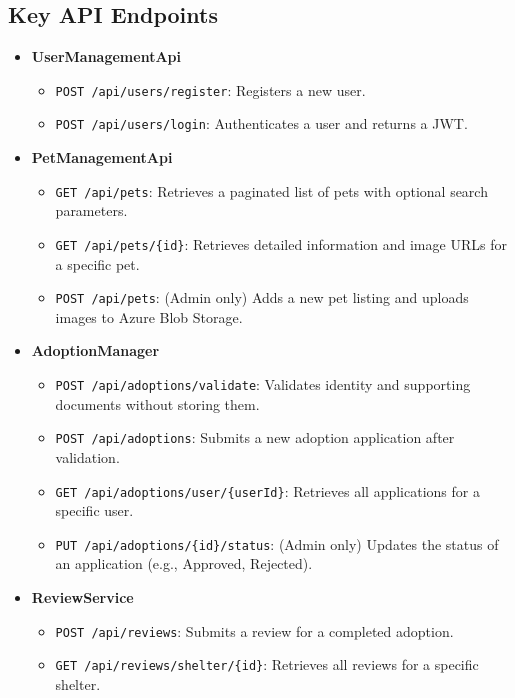 \subsection*{Key API Endpoints}
\begin{itemize}
    \item \textbf{UserManagementApi}
    \begin{itemize}
        \item \texttt{POST /api/users/register}: Registers a new user.
        \item \texttt{POST /api/users/login}: Authenticates a user and returns a JWT.
    \end{itemize}
    
    \item \textbf{PetManagementApi}
    \begin{itemize}
        \item \texttt{GET /api/pets}: Retrieves a paginated list of pets with optional search parameters.
        \item \texttt{GET /api/pets/\{id\}}: Retrieves detailed information and image URLs for a specific pet.
        \item \texttt{POST /api/pets}: (Admin only) Adds a new pet listing and uploads images to Azure Blob Storage.
    \end{itemize}
    
    \item \textbf{AdoptionManager}
    \begin{itemize}
        \item \texttt{POST /api/adoptions/validate}: Validates identity and supporting documents without storing them.
        \item \texttt{POST /api/adoptions}: Submits a new adoption application after validation.
        \item \texttt{GET /api/adoptions/user/\{userId\}}: Retrieves all applications for a specific user.
        \item \texttt{PUT /api/adoptions/\{id\}/status}: (Admin only) Updates the status of an application (e.g., Approved, Rejected).
    \end{itemize}
    
    \item \textbf{ReviewService}
    \begin{itemize}
        \item \texttt{POST /api/reviews}: Submits a review for a completed adoption.
        \item \texttt{GET /api/reviews/shelter/\{id\}}: Retrieves all reviews for a specific shelter.
    \end{itemize}
\end{itemize}
